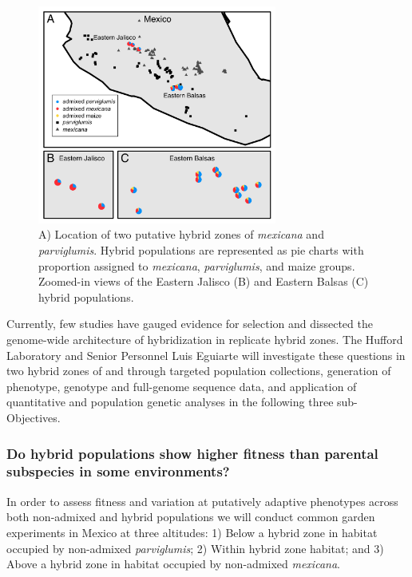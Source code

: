 \begin{figure}[h!]
  \centering
   \includegraphics[width=0.7\textwidth]{Figure1.jpg}
    \caption{A) Location of two putative hybrid zones of \emph{mexicana} and \emph{parviglumis}.  Hybrid populations are represented as pie charts with proportion assigned to \emph{mexicana}, \emph{parviglumis}, and maize groups. Zoomed-in views of the Eastern Jalisco (B) and Eastern Balsas (C) hybrid populations.} 
\label{fig:pies}
\end{figure}

Currently, few studies have gauged evidence for selection and dissected the genome-wide architecture of hybridization in replicate hybrid zones.
The Hufford Laboratory and Senior Personnel Luis Eguiarte will investigate these questions in two hybrid zones of \zm{} and \zp{} through targeted population collections, generation of phenotype, genotype and full-genome sequence data, and application of quantitative and population genetic analyses in the following three sub-Objectives.


\subsubsection{Do hybrid populations show higher fitness than parental subspecies in some environments?} 
\label{sss:fitness}


In order to assess fitness and variation at putatively adaptive phenotypes across both non-admixed and  hybrid populations we will conduct common garden experiments in Mexico at three altitudes: 1) Below a hybrid zone in habitat occupied by non-admixed \emph{parviglumis}; 2) Within hybrid zone habitat; and 3) Above a hybrid zone in habitat occupied by non-admixed \emph{mexicana}. 


